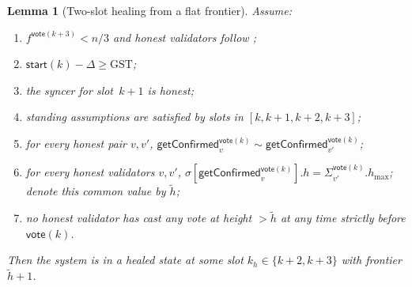 \ifx\litemode\undefined\documentclass{article}\fi
\newcommand{\hmax}{\ensuremath{h_{\max}}\xspace}
\newcommand{\start}{\ensuremath{\mathsf{start}}}
\newcommand{\vote}{\ensuremath{\mathsf{vote}}}
\newcommand{\GST}{\ensuremath{\mathrm{GST}}\xspace}
\newcommand{\comm}[1]{\ensuremath{\widetilde{#1}}}
\newcommand{\getConfirmed}{\textsf{getConfirmed}\xspace}
\theoremstyle{plain}
\newtheorem{lemma}{Lemma}
\theoremstyle{definition}
\theoremstyle{remark}
\begin{document}
\begin{lemma}[Two-slot healing from a flat frontier]\label{lem:healing-2slot-flat-frontier}
Assume:
\begin{enumerate}
  \item\label{rev:hfj:f} $f^{\vote(k+3)} < n/3$ and honest validators follow ;
  \item\label{rev:hfj:sync} $\start(k) - \Delta \geq \GST$;
  \item\label{rev:hfj:syncers} the syncer for slot~$k+1$ is honest;
  \item\label{rev:hfj:standing} standing assumptions are satisfied by slots in $[k,k+1,k+2,k+3]$;
  \item\label{rev:hfj:compat} for every honest pair $v, v'$, $\getConfirmed_v^{\vote(k)} \sim \getConfirmed_{v'}^{\vote(k)}$;
  \item\label{rev:hfj:gt-hmax} for every honest validators $v, v'$, $\sigma[\getConfirmed_v^{\vote(k)}].h = \Sigma_{v'}^{\vote(k)}.\hmax$; denote this common value by $\comm{h}$;
  \item\label{rev:hfj:nh} no honest validator has cast any vote at height $> \comm{h}$ at any time strictly before $\vote(k)$.
\end{enumerate}
Then the system is in a healed state at some slot $k_h \in \{k+2, k+3\}$ with frontier $\comm{h}+1$.
\end{lemma}
\end{document}
